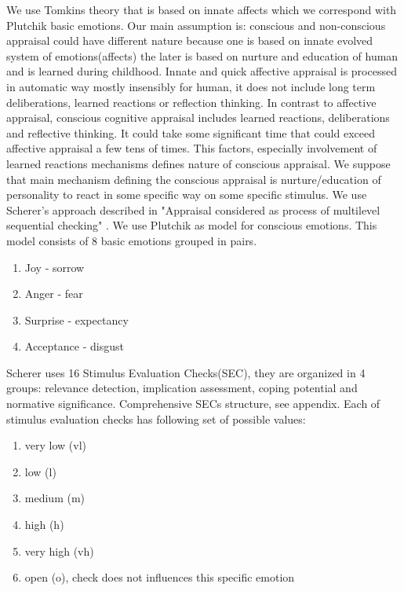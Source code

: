 We use Tomkins theory that is based on innate affects which we correspond with Plutchik basic emotions\cite{natureofemotions}. Our main assumption is: conscious and non-conscious appraisal could have different nature because one is based on innate evolved system of emotions(affects) the later is based on nurture and education of human and is learned during childhood. Innate and quick affective appraisal is processed in automatic way mostly insensibly for human, it does not include long term deliberations, learned reactions or reflection thinking. In contrast to affective appraisal, conscious cognitive appraisal includes learned reactions, deliberations and reflective thinking. It could take some significant time that could exceed affective appraisal a few tens of times. This factors, especially involvement of learned reactions mechanisms defines nature of conscious appraisal. We suppose that main mechanism defining the conscious appraisal is nurture/education of personality to react in some specific way on some specific stimulus. We use Scherer's approach described in "Appraisal considered as process of multilevel sequential checking" \cite{appraisal_considered_as_a_process}. We use Plutchik \cite{natureofemotions} as model for conscious emotions. This model consists of 8 basic emotions grouped in pairs.

\begin{enumerate}
 \item  Joy - sorrow
 \item  Anger - fear
 \item  Surprise - expectancy
 \item  Acceptance - disgust
\end{enumerate}

Scherer uses 16 Stimulus Evaluation Checks(SEC), they are organized in 4 groups: relevance detection, implication assessment, coping potential and normative significance. Comprehensive SECs structure, see appendix.
Each of stimulus evaluation checks has following set of possible values:

\begin{enumerate}
 \item  very low (vl)
 \item  low (l)
 \item  medium (m)
 \item  high (h)
 \item  very high (vh)
 \item  open (o), check does not influences this specific emotion
\end{enumerate}

